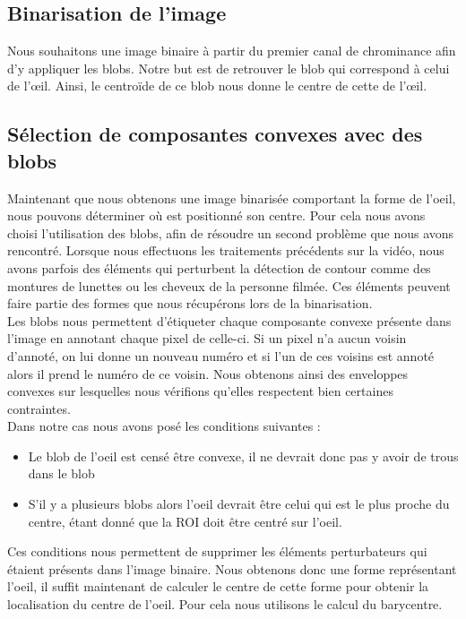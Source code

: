 \subsection{Binarisation de l'image}
Nous souhaitons une image binaire à partir du premier canal de chrominance afin d'y appliquer les blobs. 
Notre but est de retrouver le blob qui correspond à celui de l'œil. Ainsi, le centroïde de ce blob nous 
donne le centre de cette de l'œil.\\




\subsection{Sélection de composantes convexes avec des blobs}
Maintenant que nous obtenons une image binarisée comportant la forme de l'oeil, nous pouvons déterminer où est
positionné son centre. Pour cela nous avons choisi l'utilisation des blobs, afin de résoudre un second 
problème que nous avons rencontré. Lorsque nous effectuons les traitements précédents sur la vidéo, nous avons
parfois des éléments qui perturbent la détection de contour comme des montures de lunettes ou les cheveux de la personne 
filmée. Ces éléments peuvent faire partie des formes que nous récupérons lors de la binarisation.\\ 

Les blobs nous permettent d'étiqueter chaque composante convexe présente dans l'image en annotant
chaque pixel de celle-ci. Si un pixel n'a aucun voisin d'annoté, on lui donne un nouveau numéro et si
l'un de ces voisins est annoté alors il prend le numéro de ce voisin. Nous obtenons ainsi des enveloppes
convexes sur lesquelles nous vérifions qu'elles respectent bien certaines contraintes.\\

Dans notre cas nous avons posé les conditions suivantes :
\begin{itemize}
 \item Le blob de l'oeil est censé être convexe, il ne devrait donc pas y avoir de trous dans le blob
 \item S'il y a plusieurs blobs alors l'oeil devrait être celui qui est le plus proche du centre, étant
 donné que la ROI doit être centré sur l'oeil.
\end{itemize}
Ces conditions nous permettent de supprimer les éléments perturbateurs qui étaient présents dans l'image binaire.
Nous obtenons donc une forme représentant l'oeil, il suffit maintenant de calculer le centre de cette forme
pour obtenir la localisation du centre de l'oeil. Pour cela nous utilisons le calcul du barycentre.